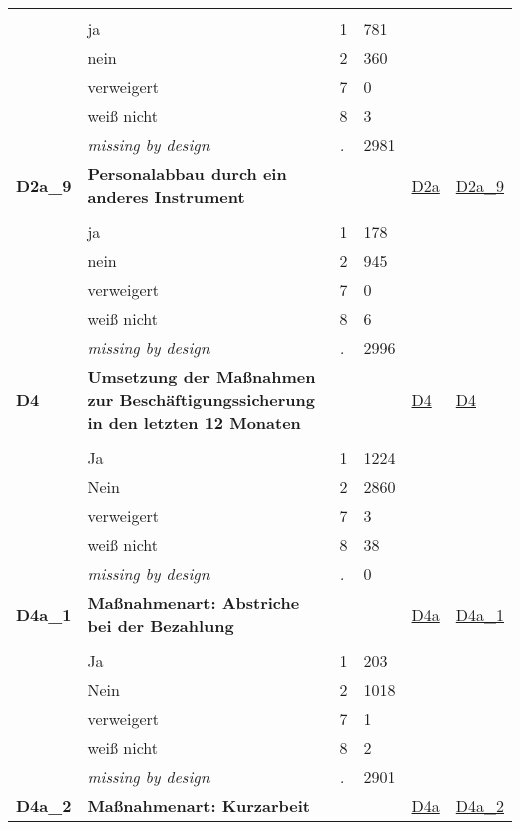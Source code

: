 \begin{longtable}{| L{2.45cm} | L{6cm} | C{1.5cm} | R{1cm} | C{2.25cm} | C{2.25cm} |}
   &  &  &  &  &  \\ 
   & ja & 1 & 781 &  &  \\ 
   & nein & 2 & 360 &  &  \\ 
   & verweigert & 7 & 0 &  &  \\ 
   & weiß nicht & 8 & 3 &  &  \\ 
   & \textit{missing by design} & \textit{.} & 2981 &  &  \\ 
   \midrule
\textbf{D2a\_9}\label{var:D2a:9} & \textbf{Personalabbau durch ein anderes Instrument} &  &  & \hyperref[D2a]{D2a} & \hyperref[var:suf:D2a:9]{D2a\_9} \\ 
   &  &  &  &  &  \\ 
   & ja & 1 & 178 &  &  \\ 
   & nein & 2 & 945 &  &  \\ 
   & verweigert & 7 & 0 &  &  \\ 
   & weiß nicht & 8 & 6 &  &  \\ 
   & \textit{missing by design} & \textit{.} & 2996 &  &  \\ 
   \midrule
\textbf{D4}\label{var:D4} & \textbf{Umsetzung der Maßnahmen zur Beschäftigungssicherung in den letzten 12 Monaten} &  &  & \hyperref[D4]{D4} & \hyperref[var:suf:D4]{D4} \\ 
   &  &  &  &  &  \\ 
   & Ja & 1 & 1224 &  &  \\ 
   & Nein & 2 & 2860 &  &  \\ 
   & verweigert & 7 & 3 &  &  \\ 
   & weiß nicht & 8 & 38 &  &  \\ 
   & \textit{missing by design} & \textit{.} & 0 &  &  \\ 
   \midrule
\textbf{D4a\_1}\label{var:D4a:1} & \textbf{Maßnahmenart: Abstriche bei der Bezahlung} &  &  & \hyperref[D4a]{D4a} & \hyperref[var:suf:D4a:1]{D4a\_1} \\ 
   &  &  &  &  &  \\ 
   & Ja & 1 & 203 &  &  \\ 
   & Nein & 2 & 1018 &  &  \\ 
   & verweigert & 7 & 1 &  &  \\ 
   & weiß nicht & 8 & 2 &  &  \\ 
   & \textit{missing by design} & \textit{.} & 2901 &  &  \\ 
   \midrule
\textbf{D4a\_2}\label{var:D4a:2} & \textbf{Maßnahmenart: Kurzarbeit} &  &  & \hyperref[D4a]{D4a} & \hyperref[var:suf:D4a:2]{D4a\_2} \\ 

\end{longtable}

